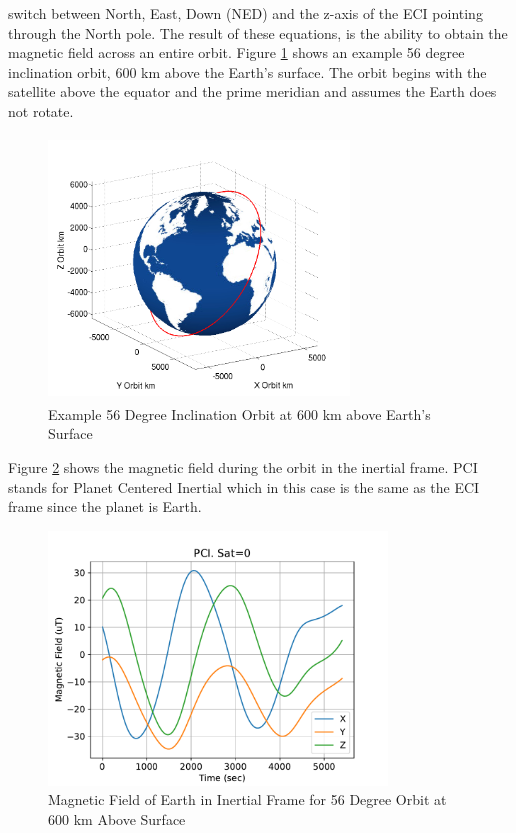 switch between North, East, Down (NED) and the z-axis of the ECI
pointing through the North pole. The result of these equations, is the
ability to obtain the magnetic field  
across an entire orbit. Figure \ref{f:orbit} shows an example 56
degree inclination orbit, 600 km above the Earth's surface. The orbit
begins with the satellite above the equator and the prime meridian and
assumes the Earth does not rotate.
\begin{figure}[H]
  \begin{center}
  \includegraphics[height=70mm, width=80mm]{Figures/Earth_Orbit.png}
  \end{center}
  \caption{Example 56 Degree Inclination Orbit at 600 km above Earth's
  Surface}\label{f:orbit}
\end{figure}
Figure \ref{f:mag_orbit} shows the magnetic field during the orbit in the
inertial frame. PCI stands for Planet Centered Inertial which in this
case is the same as the ECI frame since the planet is Earth. 
\begin{figure}[H]
  \begin{center}
  \includegraphics[width=90mm]{Figures/Magnetic_Field_Orbit}
  \end{center}
  \caption{Magnetic Field of Earth in Inertial Frame for 56 Degree
    Orbit at 600 km Above Surface}\label{f:mag_orbit}
\end{figure}
